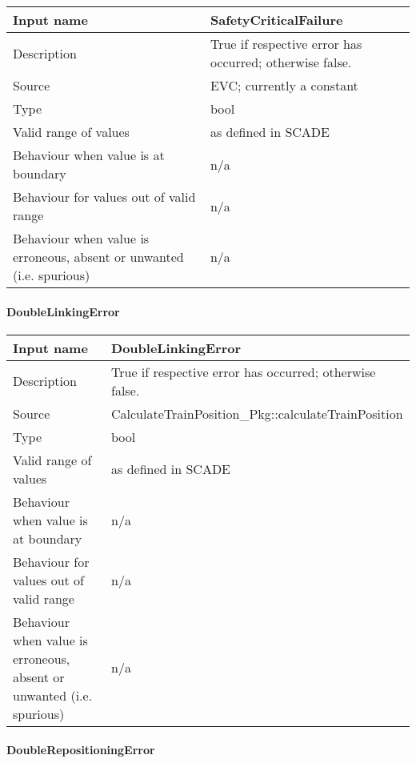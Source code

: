 \begin{longtable}{p{}p{}}
\toprule
Input name				& SafetyCriticalFailure \\
\midrule
Description				& True if respective error has occurred; otherwise false. \\
\midrule
Source					& EVC; currently a constant \\ 
\midrule
Type					& bool \\
\midrule
Valid range of values	& as defined in SCADE \\
\midrule
Behaviour when value is at boundary	& n/a \\
\midrule
Behaviour for values out of valid range	& n/a \\
\midrule
Behaviour when value is erroneous, absent or unwanted (i.e. spurious) & n/a \\
\bottomrule
\end{longtable}

\paragraph{DoubleLinkingError}

\begin{longtable}{p{}p{}}
\toprule
Input name				& DoubleLinkingError \\
\midrule
Description				& True if respective error has occurred; otherwise false. \\
\midrule
Source					& CalculateTrainPosition\_Pkg::calculateTrainPosition \\ 
\midrule
Type					& bool \\
\midrule
Valid range of values	& as defined in SCADE \\
\midrule
Behaviour when value is at boundary	& n/a \\
\midrule
Behaviour for values out of valid range	& n/a \\
\midrule
Behaviour when value is erroneous, absent or unwanted (i.e. spurious) & n/a \\
\bottomrule
\end{longtable}

\paragraph{DoubleRepositioningError}

